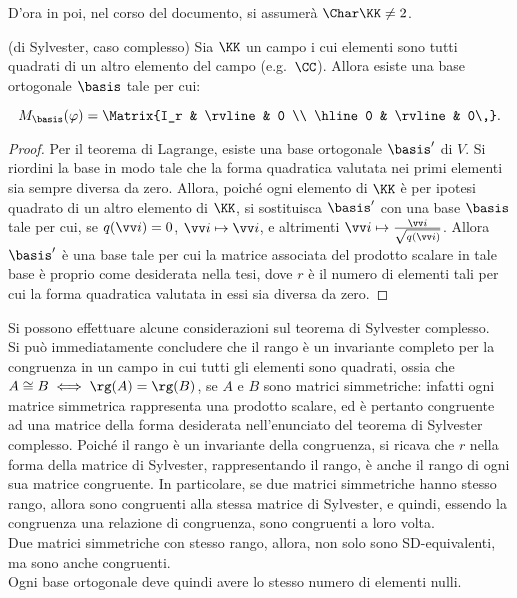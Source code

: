 \begin{note}
	D'ora in poi, nel corso del documento, si assumerà $\Char \KK \neq 2$.
\end{note}

\begin{theorem} (di Sylvester, caso complesso)
	Sia $\KK$ un campo i cui elementi sono tutti quadrati di un
	altro elemento del campo (e.g.~$\CC$). Allora esiste una base
	ortogonale $\basis$ tale per cui:
	
	\[ M_\basis(\varphi) = \Matrix{I_r & \rvline & 0 \\ \hline 0 & \rvline & 0\,}. \]
\end{theorem}

\begin{proof}
	Per il teorema di Lagrange, esiste una base ortogonale $\basis'$ di $V$.
	Si riordini la base in modo tale che la forma quadratica valutata nei primi elementi sia sempre diversa da zero. Allora, poiché ogni
	elemento di $\KK$ è per ipotesi quadrato di un altro elemento
	di $\KK$, si sostituisca $\basis'$ con una base $\basis$ tale per
	cui, se $q(\vv i) = 0$, $\vv i \mapsto \vv i$, e altrimenti
	$\vv i \mapsto \frac{\vv i}{\sqrt{q(\vv i)}}$. Allora $\basis'$
	è una base tale per cui la matrice associata del prodotto scalare
	in tale base è proprio come desiderata nella tesi, dove $r$ è
	il numero di elementi tali per cui la forma quadratica valutata
	in essi sia diversa da zero.
\end{proof}

\begin{remark}
	Si possono effettuare alcune considerazioni sul teorema di Sylvester
	complesso. \\
	
	\li Si può immediatamente concludere che il rango è un invariante
	completo per la congruenza in un campo in cui tutti gli elementi
	sono quadrati, ossia che $A \cong B \iff \rg(A) = \rg(B)$, se $A$ e
	$B$ sono matrici simmetriche: infatti
	ogni matrice simmetrica rappresenta una prodotto scalare, ed è
	pertanto congruente ad una matrice della forma desiderata
	nell'enunciato del teorema di Sylvester complesso. Poiché il rango
	è un invariante della congruenza, si ricava che $r$ nella forma
	della matrice di Sylvester, rappresentando il rango, è anche
	il rango di ogni sua matrice congruente. In particolare, se due
	matrici simmetriche hanno stesso rango, allora sono congruenti
	alla stessa matrice di Sylvester, e quindi, essendo la congruenza
	una relazione di congruenza, sono congruenti a loro volta. \\
	\li Due matrici simmetriche con stesso rango, allora, non solo
	sono SD-equivalenti, ma sono anche congruenti. \\
	\li Ogni base ortogonale deve quindi avere lo stesso numero
	di elementi nulli.
\end{remark}

